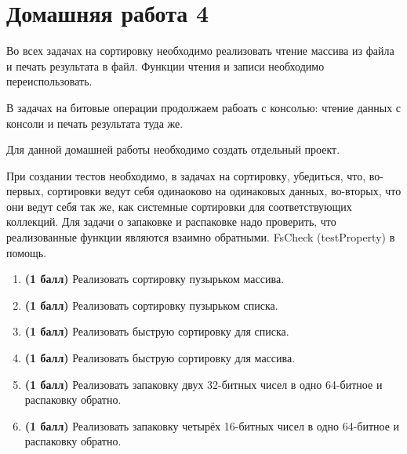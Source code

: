 \section{Домашняя работа 4}

Во всех задачах на сортировку необходимо реализовать чтение массива из файла и печать результата в файл. Функции чтения и записи необходимо переиспользовать.

В задачах на битовые операции продолжаем рабоать с консолью: чтение данных с консоли и печать результата туда же.

Для данной домашней работы необходимо создать отдельный проект.

При создании тестов необходимо, в задачах на сортировку, убедиться, что, во-первых, сортировки ведут себя одинаоково на одинаковых данных, во-вторых, что они ведут себя так же, как системные сортировки для соответствующих коллекций. Для задачи о запаковке и распаковке надо проверить, что реализованные функции являются взаимно обратными. FsCheck (testProperty) в помощь.

\begin{enumerate}
    \item \textbf{(1 балл)} Реализовать сортировку пузырьком массива. 
    \item \textbf{(1 балл)} Реализовать сортировку пузырьком списка.
    \item \textbf{(1 балл)} Реализовать быструю сортировку для списка.
    \item \textbf{(1 балл)} Реализовать быструю сортировку для массива.
    \item \textbf{(1 балл)} Реализовать запаковку двух 32-битных чисел в одно 64-битное и распаковку обратно. 
    \item \textbf{(1 балл)} Реализовать запаковку четырёх 16-битных чисел в одно 64-битное и распаковку обратно. 
\end{enumerate}